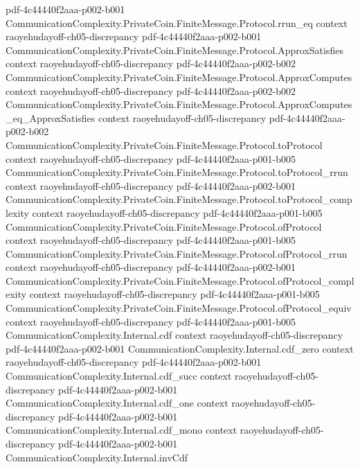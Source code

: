\begin{theorem}
  {pdf-4c44440f2aaa-p002-b001}
\proofstep
  {CommunicationComplexity.PrivateCoin.FiniteMessage.Protocol.rrun_eq}
  {context}
  {raoyehudayoff-ch05-discrepancy}
  {pdf-4c44440f2aaa-p002-b001}
\proofstep
  {CommunicationComplexity.PrivateCoin.FiniteMessage.Protocol.ApproxSatisfies}
  {context}
  {raoyehudayoff-ch05-discrepancy}
  {pdf-4c44440f2aaa-p002-b002}
\proofstep
  {CommunicationComplexity.PrivateCoin.FiniteMessage.Protocol.ApproxComputes}
  {context}
  {raoyehudayoff-ch05-discrepancy}
  {pdf-4c44440f2aaa-p002-b002}
\proofstep
  {CommunicationComplexity.PrivateCoin.FiniteMessage.Protocol.ApproxComputes_eq_ApproxSatisfies}
  {context}
  {raoyehudayoff-ch05-discrepancy}
  {pdf-4c44440f2aaa-p002-b002}
\proofstep
  {CommunicationComplexity.PrivateCoin.FiniteMessage.Protocol.toProtocol}
  {context}
  {raoyehudayoff-ch05-discrepancy}
  {pdf-4c44440f2aaa-p001-b005}
\proofstep
  {CommunicationComplexity.PrivateCoin.FiniteMessage.Protocol.toProtocol_rrun}
  {context}
  {raoyehudayoff-ch05-discrepancy}
  {pdf-4c44440f2aaa-p002-b001}
\proofstep
  {CommunicationComplexity.PrivateCoin.FiniteMessage.Protocol.toProtocol_complexity}
  {context}
  {raoyehudayoff-ch05-discrepancy}
  {pdf-4c44440f2aaa-p001-b005}
\proofstep
  {CommunicationComplexity.PrivateCoin.FiniteMessage.Protocol.ofProtocol}
  {context}
  {raoyehudayoff-ch05-discrepancy}
  {pdf-4c44440f2aaa-p001-b005}
\proofstep
  {CommunicationComplexity.PrivateCoin.FiniteMessage.Protocol.ofProtocol_rrun}
  {context}
  {raoyehudayoff-ch05-discrepancy}
  {pdf-4c44440f2aaa-p002-b001}
\proofstep
  {CommunicationComplexity.PrivateCoin.FiniteMessage.Protocol.ofProtocol_complexity}
  {context}
  {raoyehudayoff-ch05-discrepancy}
  {pdf-4c44440f2aaa-p001-b005}
\proofstep
  {CommunicationComplexity.PrivateCoin.FiniteMessage.Protocol.ofProtocol_equiv}
  {context}
  {raoyehudayoff-ch05-discrepancy}
  {pdf-4c44440f2aaa-p001-b005}
\proofstep
  {CommunicationComplexity.Internal.cdf}
  {context}
  {raoyehudayoff-ch05-discrepancy}
  {pdf-4c44440f2aaa-p002-b001}
\proofstep
  {CommunicationComplexity.Internal.cdf_zero}
  {context}
  {raoyehudayoff-ch05-discrepancy}
  {pdf-4c44440f2aaa-p002-b001}
\proofstep
  {CommunicationComplexity.Internal.cdf_succ}
  {context}
  {raoyehudayoff-ch05-discrepancy}
  {pdf-4c44440f2aaa-p002-b001}
\proofstep
  {CommunicationComplexity.Internal.cdf_one}
  {context}
  {raoyehudayoff-ch05-discrepancy}
  {pdf-4c44440f2aaa-p002-b001}
\proofstep
  {CommunicationComplexity.Internal.cdf_mono}
  {context}
  {raoyehudayoff-ch05-discrepancy}
  {pdf-4c44440f2aaa-p002-b001}
\proofstep
  {CommunicationComplexity.Internal.invCdf}

\end{theorem}
